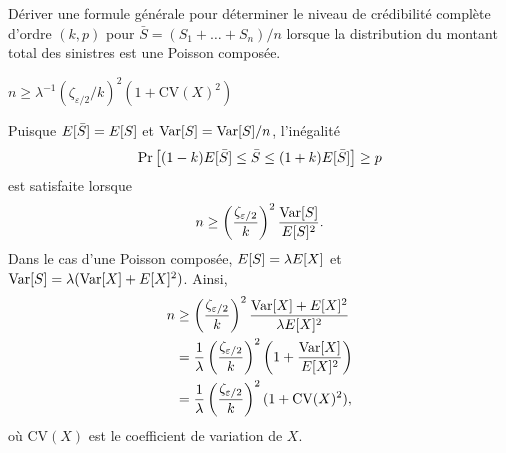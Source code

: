 \begin{exercice}
  \label{ex:stabilite:nPC}
  Dériver une formule générale pour déterminer le niveau de
  crédibilité complète d'ordre $(k, p)$ pour $\bar{S} = (S_1 + \dots +
  S_n)/n$ lorsque la distribution du montant total des sinistres est
  une Poisson composée.
  \begin{rep}
    $n \geq \lambda^{-1} (\zeta_{\varepsilon/2}/k)^2 (1 + \mathrm{CV}(X)^2)$
  \end{rep}
  \begin{sol}
    Puisque $E [ \bar{S} ] = E [ S ]$ et $\operatorname{Var} [ S ] = \operatorname{Var} [ S ]/n$,
    l'inégalité
    \begin{displaymath}
      \Pr
      \left[
        (1 - k) E [ \bar{S} ] \leq \bar{S} \leq (1 + k) E [ \bar{S} ]
      \right]
      \geq p
    \end{displaymath}
    est satisfaite lorsque
    \begin{displaymath}
      n \ge
      \left( \frac{\zeta_{\varepsilon/2}}{k} \right)^2
      \frac{\operatorname{Var} [ S ]}{E [ S ]^2}.
    \end{displaymath}
    Dans le cas d'une Poisson composée, $E [ S ] = \lambda E [ X ]$ et
    $\operatorname{Var} [ S ] = \lambda (\operatorname{Var} [ X ] + E [ X ]^2)$. Ainsi,
    \begin{align*}
      n
      & \geq \left( \frac{\zeta_{\varepsilon/2}}{k} \right)^2
      \frac{\operatorname{Var} [ X ] + E [ X ]^2}{\lambda E [ X ]^2} \\
      &= \frac{1}{\lambda} \left( \frac{\zeta_{\varepsilon/2}}{k}
      \right)^2 \left( 1 + \frac{\operatorname{Var} [ X ]}{E [ X ]^2}
      \right) \\
      &= \frac{1}{\lambda} \left( \frac{\zeta_{\varepsilon/2}}{k}
      \right)^2 (1 + \mathrm{CV}(X)^2),
    \end{align*}
    où $\mathrm{CV}(X)$ est le coefficient de variation de $X$.
  \end{sol}
\end{exercice}

